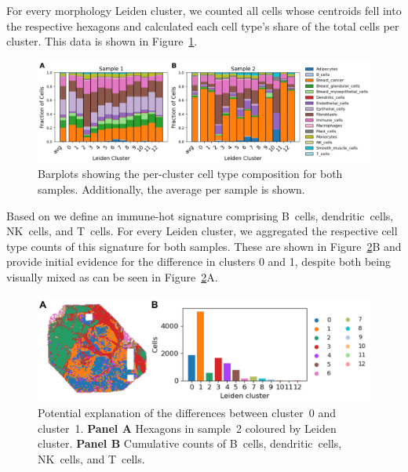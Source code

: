 \documentclass{article}
\begin{document}
For every morphology Leiden cluster, we counted all cells whose centroids fell into the respective hexagons and calculated each cell type's share of the total cells per cluster. This data is shown in Figure~\ref{fig:spatial_composition}.

\begin{figure}[htbp!]
\centering
\includegraphics[width=.95\linewidth]{./figs/fig_S3_spatial_composition.png}
\caption{\label{fig:spatial_composition}{}Barplots showing the per-cluster cell type composition for both samples. Additionally, the average per sample is shown.}
\end{figure}

\newpage

Based on \citep{Wu2024-zp} we define an immune-hot signature comprising B~cells, dendritic~cells, NK~cells, and T~cells. For every Leiden cluster, we aggregated the respective cell type counts of this signature for both samples. These are shown in Figure~\ref{fig:spatial_immunehot}B and provide initial evidence for the difference in clusters 0 and 1, despite both being visually mixed as can be seen in Figure~\ref{fig:spatial_immunehot}A.

\begin{figure}[htbp!]
\centering
\includegraphics[width=.85\linewidth]{./figs/fig_S5_immunehot.png}
\caption{\label{fig:spatial_immunehot}{}Potential explanation of the differences between cluster~0 and cluster~1. \textbf{Panel A} Hexagons in sample~2 coloured by Leiden cluster. \textbf{Panel B} Cumulative counts of B~cells, dendritic~cells, NK~cells, and T~cells.}
\end{figure}




\end{document}
